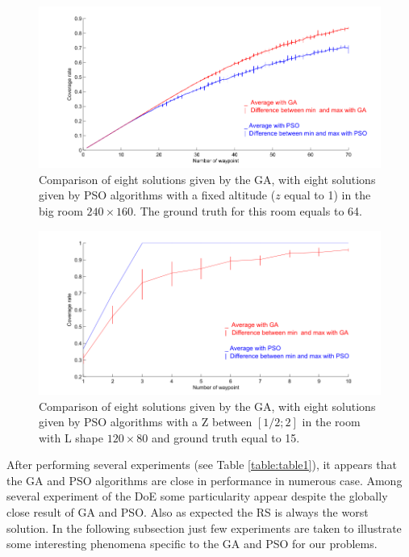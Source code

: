 \begin{figure}[!]
  \includegraphics[width=\linewidth]{img/fig8.png}
  \caption{ Comparison of eight solutions given by the GA, with eight solutions given by PSO algorithms with a fixed altitude ($z$ equal to 1) in the big room $240\times160$. The ground truth for this room equals to 64.}
  \label{fig:bigRz1}
   \endminipage\hfill
\end{figure}
%
%
\begin{figure}[!]
  \includegraphics[width=\linewidth]{img/fig9.png}
  \caption{Comparison of eight solutions given by the GA, with eight solutions given by PSO algorithms with a Z between $[1/2; 2]$ in the room with L shape $120\times80$ and ground truth equal to 15.}\label{fig:RLz2}
   \endminipage\hfill
\end{figure}
After performing several experiments (see Table \ref{table:table1}), it appears that the GA and PSO algorithms are close in performance in numerous case. Among several experiment of the DoE some particularity appear despite the globally close result of GA and PSO. Also as expected the RS is always the worst solution.
 In the following subsection just few experiments are taken to illustrate some interesting phenomena specific to the GA and PSO for our problems.

